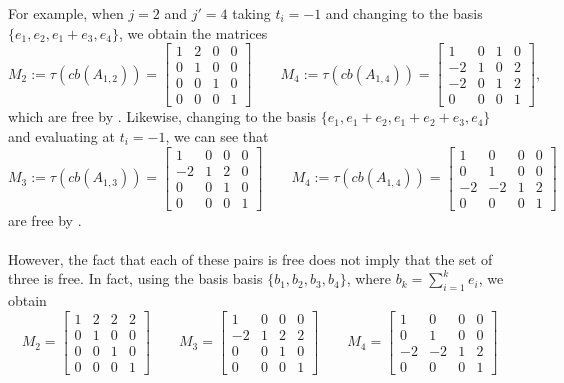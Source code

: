 \documentclass[11pt]{article}
\begin{document}
	\noindent 
	For example, when $j=2$ and $j'=4$ taking $t_i=-1$ and changing to the basis $\{e_1,e_2,e_1+e_3,e_4\}$, we obtain the matrices 
	$$M_2:=\tau(cb(A_{1,2}))=
	\begin{bmatrix}
	1&2&0&0\\
	0&1&0&0\\
	0&0&1&0\\
	0&0&0&1
	\end{bmatrix}
	\qquad
	M_4:=\tau(cb(A_{1,4}))=
	\begin{bmatrix}
	1&0&1&0\\
	-2&1&0&2\\
	-2&0&1&2\\
	0&0&0&1
	\end{bmatrix},
	$$
	which are free by . Likewise, changing to the basis $\{e_1,e_1+e_2,e_1+e_2+e_3,e_4\}$ and evaluating at $t_i=-1$, we can see that 
	$$M_3:=\tau(cb(A_{1,3}))=
	\begin{bmatrix}
	1&0&0&0\\
	-2&1&2&0\\
	0&0&1&0\\
	0&0&0&1
	\end{bmatrix}
	\qquad
	M_4:=\tau(cb(A_{1,4}))=
	\begin{bmatrix}
	1&0&0&0\\
	0&1&0&0\\
	-2&-2&1&2\\
	0&0&0&1
	\end{bmatrix}
	$$ 
	are free by .
	\\
	\\
	However, the fact that each of these pairs is free does not imply that the set of three is free. In fact, using the basis
	basis $\{b_1,b_2,b_3,b_4\}$, where $b_k=\sum_{i=1}^k e_i$, we obtain
	$$M_2=
	\begin{bmatrix}
	1 & 2 & 2 & 2 \\
	0 & 1 & 0 & 0\\
	0 & 0 & 1 & 0\\
	0 & 0 & 0 & 1
	\end{bmatrix}
	\qquad 
	M_3=
	\begin{bmatrix}
	1& 0 & 0 & 0 \\
	-2 & 1 & 2 & 2\\
	0 & 0 & 1 & 0\\
	0 & 0 & 0 & 1
	\end{bmatrix}
	\qquad
	M_4=
	\begin{bmatrix}
	1 & 0 & 0 & 0 \\
	0 & 1 & 0 & 0\\
	-2 & -2 & 1 & 2\\
	0 & 0 & 0 & 1
	\end{bmatrix}$$
\end{document}

